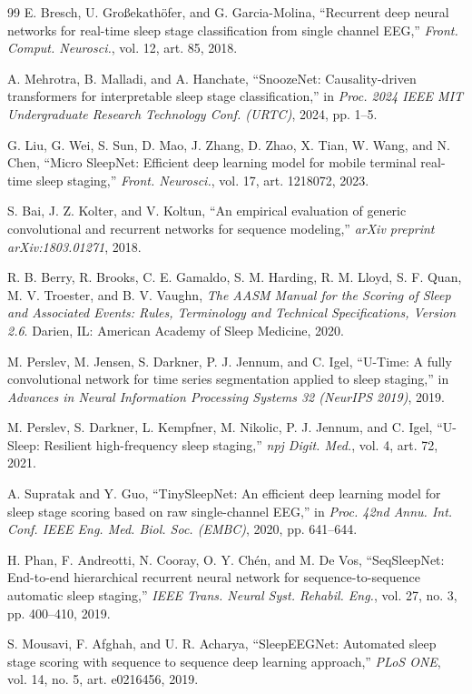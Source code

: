 \documentclass[conference]{IEEEtran}
\begin{document}
\begin{thebibliography}{99}
 E. Bresch, U. Gro\ss{}ekath\"ofer, and G. Garcia-Molina, ``Recurrent deep neural
networks for real-time sleep stage classification from single channel EEG,'' \emph{Front. Comput.
Neurosci.}, vol. 12, art. 85, 2018.

 A. Mehrotra, B. Malladi, and A. Hanchate, ``SnoozeNet: Causality-driven
transformers for interpretable sleep stage classification,'' in \emph{Proc. 2024 IEEE MIT
Undergraduate Research Technology Conf. (URTC)}, 2024, pp. 1--5.

 G. Liu, G. Wei, S. Sun, D. Mao, J. Zhang, D. Zhao, X. Tian, W. Wang, and
N. Chen, ``Micro SleepNet: Efficient deep learning model for mobile terminal real-time sleep
staging,'' \emph{Front. Neurosci.}, vol. 17, art. 1218072, 2023.

 S. Bai, J. Z. Kolter, and V. Koltun, ``An empirical evaluation of generic convolutional
and recurrent networks for sequence modeling,'' \emph{arXiv preprint arXiv:1803.01271}, 2018.

 R. B. Berry, R. Brooks, C. E. Gamaldo, S. M. Harding, R. M. Lloyd, S. F. Quan,
M. V. Troester, and B. V. Vaughn, \emph{The AASM Manual for the Scoring of Sleep and Associated
Events: Rules, Terminology and Technical Specifications, Version 2.6}. Darien, IL: American Academy
of Sleep Medicine, 2020.

 M. Perslev, M. Jensen, S. Darkner, P. J. Jennum, and C. Igel, ``U-Time: A fully
convolutional network for time series segmentation applied to sleep staging,'' in \emph{Advances in
Neural Information Processing Systems 32 (NeurIPS 2019)}, 2019.

 M. Perslev, S. Darkner, L. Kempfner, M. Nikolic, P. J. Jennum, and C. Igel,
``U-Sleep: Resilient high-frequency sleep staging,'' \emph{npj Digit. Med.}, vol. 4, art. 72, 2021.

 A. Supratak and Y. Guo, ``TinySleepNet: An efficient deep learning model for
sleep stage scoring based on raw single-channel EEG,'' in \emph{Proc. 42nd Annu. Int. Conf. IEEE Eng.
Med. Biol. Soc. (EMBC)}, 2020, pp. 641--644.

 H. Phan, F. Andreotti, N. Cooray, O. Y. Ch\'en, and M. De Vos, ``SeqSleepNet:
End-to-end hierarchical recurrent neural network for sequence-to-sequence automatic sleep staging,''
\emph{IEEE Trans. Neural Syst. Rehabil. Eng.}, vol. 27, no. 3, pp. 400--410, 2019.

 S. Mousavi, F. Afghah, and U. R. Acharya, ``SleepEEGNet: Automated sleep stage
scoring with sequence to sequence deep learning approach,'' \emph{PLoS ONE}, vol. 14, no. 5,
art. e0216456, 2019.


\end{thebibliography}
\end{document}
